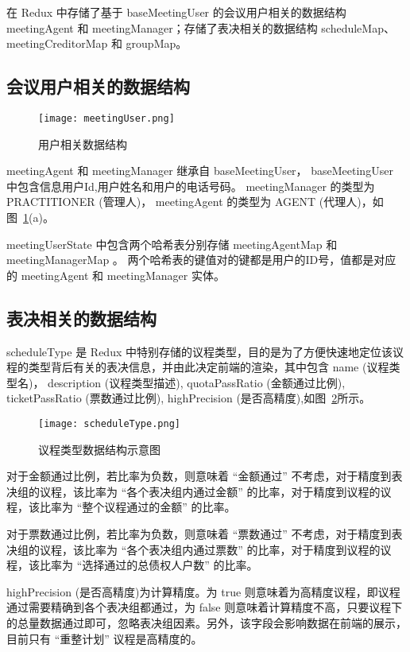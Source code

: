   在 Redux 中存储了基于 baseMeetingUser 的会议用户相关的数据结构 meetingAgent 和 meetingManager；存储了表决相关的数据结构 scheduleMap、meetingCreditorMap 和 groupMap。

  \subsection{会议用户相关的数据结构}


  \begin{figure}[!htp]
    \centering
    \texttt{[image: meetingUser.png]}
    \caption{用户相关数据结构}
    \label{fig:meetingUser}
  \end{figure}

  meetingAgent 和 meetingManager 继承自 baseMeetingUser， baseMeetingUser 中包含信息用户Id,用户姓名和用户的电话号码。 meetingManager 的类型为 PRACTITIONER (管理人)， meetingAgent 的类型为 AGENT (代理人)，如图~\ref{fig:meetingUser}(a)。

  meetingUserState 中包含两个哈希表分别存储 meetingAgentMap 和
  meetingManagerMap 。 两个哈希表的键值对的键都是用户的ID号，值都是对应的 meetingAgent 和 meetingManager 实体。

  \subsection{表决相关的数据结构}

  scheduleType 是 Redux 中特别存储的议程类型，目的是为了方便快速地定位该议程的类型背后有关的表决信息，并由此决定前端的渲染，其中包含 name (议程类型名)， description (议程类型描述), quotaPassRatio (金额通过比例), ticketPassRatio (票数通过比例), highPrecision (是否高精度),如图~\ref{fig:scheduleType}所示。

  \begin{figure}[!htp]
    \centering
    \texttt{[image: scheduleType.png]}
    \caption{议程类型数据结构示意图}
    \label{fig:scheduleType}
  \end{figure}

  对于金额通过比例，若比率为负数，则意味着 “金额通过” 不考虑，对于精度到表决组的议程，该比率为 “各个表决组内通过金额” 的比率，对于精度到议程的议程，该比率为 “整个议程通过的金额” 的比率。

  对于票数通过比例，若比率为负数，则意味着 “票数通过” 不考虑，对于精度到表决组的议程，该比率为 “各个表决组内通过票数” 的比率，对于精度到议程的议程，该比率为 “选择通过的总债权人户数” 的比率。

  highPrecision (是否高精度)为计算精度。为 true 则意味着为高精度议程，即议程通过需要精确到各个表决组都通过，为 false 则意味着计算精度不高，只要议程下的总量数据通过即可，忽略表决组因素。另外，该字段会影响数据在前端的展示，目前只有 “重整计划” 议程是高精度的。

